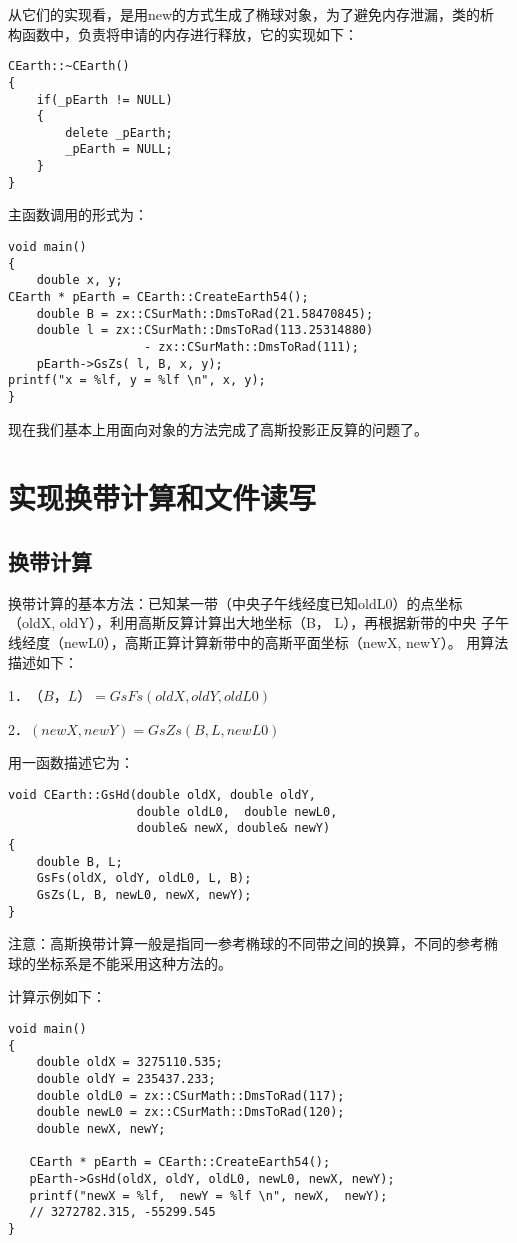 从它们的实现看，是用new的方式生成了椭球对象，为了避免内存泄漏，类的析
构函数中，负责将申请的内存进行释放，它的实现如下：
\begin{verbatim}
CEarth::~CEarth()
{
    if(_pEarth != NULL)
    {
        delete _pEarth;
        _pEarth = NULL;
    }
}
\end{verbatim}

主函数调用的形式为：
\begin{verbatim}
void main()
{
    double x, y;
CEarth * pEarth = CEarth::CreateEarth54();
    double B = zx::CSurMath::DmsToRad(21.58470845);
    double l = zx::CSurMath::DmsToRad(113.25314880)
                   - zx::CSurMath::DmsToRad(111);
    pEarth->GsZs( l, B, x, y);
printf("x = %lf, y = %lf \n", x, y);
}
\end{verbatim}
现在我们基本上用面向对象的方法完成了高斯投影正反算的问题了。

\section{实现换带计算和文件读写}
\subsection{换带计算}
换带计算的基本方法：已知某一带（中央子午线经度已知oldL0）的点坐标
（oldX, oldY），利用高斯反算计算出大地坐标（B， L），再根据新带的中央
子午线经度（newL0），高斯正算计算新带中的高斯平面坐标（newX,  newY）。
用算法描述如下：

1．$（B，L）= GsFs(oldX, oldY, oldL0)$

2．$(newX,  newY) = GsZs(B, L, newL0)$

用一函数描述它为：
\begin{verbatim}
void CEarth::GsHd(double oldX, double oldY,
                  double oldL0,  double newL0,
                  double& newX, double& newY)
{
    double B, L;
    GsFs(oldX, oldY, oldL0, L, B);
    GsZs(L, B, newL0, newX, newY);
}
\end{verbatim}

注意：高斯换带计算一般是指同一参考椭球的不同带之间的换算，不同的参考椭
球的坐标系是不能采用这种方法的。

计算示例如下：

\begin{verbatim}
void main()
{
    double oldX = 3275110.535;
    double oldY = 235437.233;
    double oldL0 = zx::CSurMath::DmsToRad(117);
    double newL0 = zx::CSurMath::DmsToRad(120);
    double newX, newY;

   CEarth * pEarth = CEarth::CreateEarth54();
   pEarth->GsHd(oldX, oldY, oldL0, newL0, newX, newY);
   printf("newX = %lf,  newY = %lf \n", newX,  newY);
   // 3272782.315, -55299.545
}
\end{verbatim}

